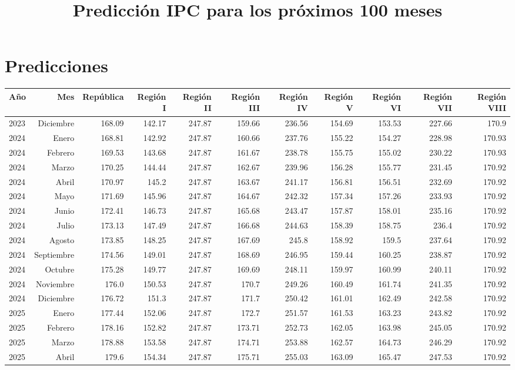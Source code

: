 \documentclass{article}%
\title{Predicción IPC para los próximos 100 meses}%
\date{}%
\begin{document}
%
\normalsize%
\maketitle%
\section{Predicciones}%
\label{sec:Predicciones}%
\begin{longtable}{|l r|r|r|r|r|r|r|r|r|r|}%
\hline%
Año&Mes&República&Región I&Región II&Región III&Región IV&Región V&Región VI&Región VII&Región VIII\\%
\hline%
2023&Diciembre&168.09&142.17&247.87&159.66&236.56&154.69&153.53&227.66&170.9\\%
2024&Enero&168.81&142.92&247.87&160.66&237.76&155.22&154.27&228.98&170.93\\%
2024&Febrero&169.53&143.68&247.87&161.67&238.78&155.75&155.02&230.22&170.93\\%
2024&Marzo&170.25&144.44&247.87&162.67&239.96&156.28&155.77&231.45&170.92\\%
2024&Abril&170.97&145.2&247.87&163.67&241.17&156.81&156.51&232.69&170.92\\%
2024&Mayo&171.69&145.96&247.87&164.67&242.32&157.34&157.26&233.93&170.92\\%
2024&Junio&172.41&146.73&247.87&165.68&243.47&157.87&158.01&235.16&170.92\\%
2024&Julio&173.13&147.49&247.87&166.68&244.63&158.39&158.75&236.4&170.92\\%
2024&Agosto&173.85&148.25&247.87&167.69&245.8&158.92&159.5&237.64&170.92\\%
2024&Septiembre&174.56&149.01&247.87&168.69&246.95&159.44&160.25&238.87&170.92\\%
2024&Octubre&175.28&149.77&247.87&169.69&248.11&159.97&160.99&240.11&170.92\\%
2024&Noviembre&176.0&150.53&247.87&170.7&249.26&160.49&161.74&241.35&170.92\\%
2024&Diciembre&176.72&151.3&247.87&171.7&250.42&161.01&162.49&242.58&170.92\\%
2025&Enero&177.44&152.06&247.87&172.7&251.57&161.53&163.23&243.82&170.92\\%
2025&Febrero&178.16&152.82&247.87&173.71&252.73&162.05&163.98&245.05&170.92\\%
2025&Marzo&178.88&153.58&247.87&174.71&253.88&162.57&164.73&246.29&170.92\\%
2025&Abril&179.6&154.34&247.87&175.71&255.03&163.09&165.47&247.53&170.92\\%

\end{longtable}
\end{document}
